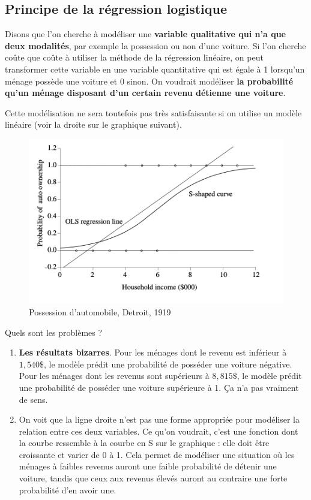 \documentclass[
  french,
]{book}
\providecommand{\tightlist}{%
  \setlength{\itemsep}{0pt}\setlength{\parskip}{0pt}}
\begin{document}
\hypertarget{principe-de-la-ruxe9gression-logistique}{%
\subsection{Principe de la régression logistique}\label{principe-de-la-ruxe9gression-logistique}}

Disons que l'on cherche à modéliser une \textbf{variable qualitative qui n'a que deux modalités}, par exemple la possession ou non d'une voiture. Si l'on cherche coûte que coûte à utiliser la méthode de la régression linéaire, on peut transformer cette variable en une variable quantitative qui est égale à 1 lorsqu'un ménage possède une voiture et 0 sinon. On voudrait modéliser \textbf{la probabilité qu'un ménage disposant d'un certain revenu détienne une voiture}.

Cette modélisation ne sera toutefois pas très satisfaisante si on utilise un modèle linéaire (voir la droite sur le graphique suivant).

\begin{figure}
\centering
\includegraphics{images/dumreg.png}
\caption{Possession d'automobile, Detroit, 1919}
\end{figure}

Quels sont les problèmes ?

\begin{enumerate}
\def\labelenumi{\arabic{enumi}.}
\tightlist
\item
  \textbf{Les résultats bizarres}. Pour les ménages dont le revenu est inférieur à \(1,540 \$\), le modèle prédit une probabilité de posséder une voiture négative. Pour les ménages dont les revenus sont supérieurs à \(8,815 \$\), le modèle prédit une probabilité de posséder une voiture supérieure à 1. Ça n'a pas vraiment de sens.
\item
  On voit que la ligne droite n'est pas une forme appropriée pour modéliser la relation entre ces deux variables. Ce qu'on voudrait, c'est une fonction dont la courbe ressemble à la courbe en S sur le graphique : elle doit être croissante et varier de 0 à 1. Cela permet de modéliser une situation où les ménages à faibles revenus auront une faible probabilité de détenir une voiture, tandis que ceux aux revenus élevés auront au contraire une forte probabilité d'en avoir une.
\end{enumerate}
\end{document}
